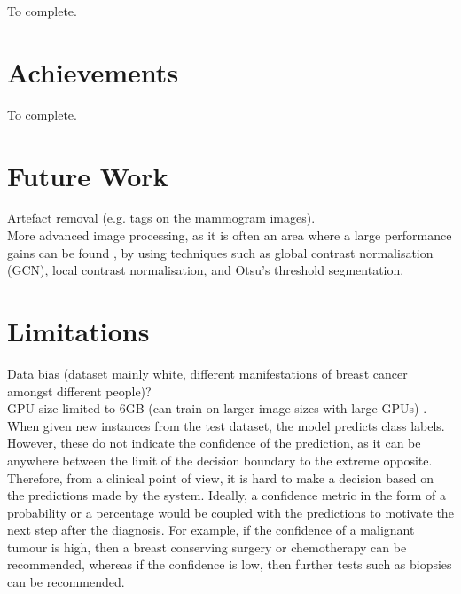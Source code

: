 To complete.


\section{Achievements}

To complete.
    

\section{Future Work}

Artefact removal (e.g. tags on the mammogram images).\\

More advanced image processing, as it is often an area where a large performance gains can be found \citep{Litjens2017}, by using techniques such as global contrast normalisation (GCN), local contrast normalisation, and Otsu’s threshold segmentation.


\section{Limitations}
\label{sec:conclusions-limitations}

Data bias (dataset mainly white, different manifestations of breast cancer amongst different people)?\\

GPU size limited to 6GB (can  train on larger image sizes with large GPUs) \citep{Shen2017}.\\

When given new instances from the test dataset, the model predicts class labels. However, these do not indicate the confidence of the prediction, as it can be anywhere between the limit of  the decision boundary to the extreme opposite. Therefore, from a clinical point of view, it is hard to make a decision based on the  predictions made by the system. Ideally, a confidence metric in the form of a probability or a percentage would be coupled with the predictions  to  motivate the next  step after the diagnosis. For example, if the confidence of  a malignant tumour is high,  then a breast conserving surgery or chemotherapy can be recommended, whereas if the confidence is low, then further tests such as biopsies  can be recommended. %
    

